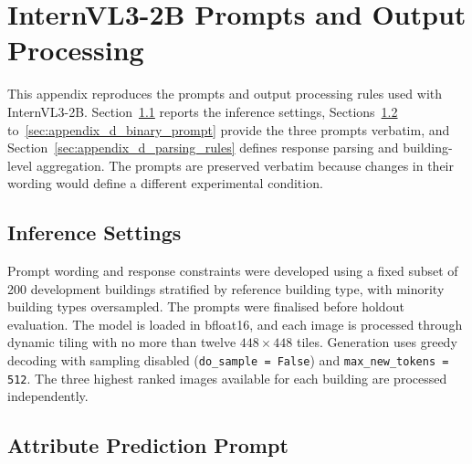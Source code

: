 \chapter{InternVL3-2B Prompts and Output Processing}
\label{ch:appendix_d}

This appendix reproduces the prompts and output processing rules used with InternVL3-2B.
Section~\ref{sec:appendix_d_inference} reports the inference settings, Sections~\ref{sec:appendix_d_attribute_prompt} to~\ref{sec:appendix_d_binary_prompt} provide the three prompts verbatim, and Section~\ref{sec:appendix_d_parsing_rules} defines response parsing and building-level aggregation.
The prompts are preserved verbatim because changes in their wording would define a different experimental condition.

\section{Inference Settings}
\label{sec:appendix_d_inference}

Prompt wording and response constraints were developed using a fixed subset of 200 development buildings stratified by reference building type, with minority building types oversampled.
The prompts were finalised before holdout evaluation.
The model is loaded in bfloat16, and each image is processed through dynamic tiling with no more than twelve \(448 \times 448\) tiles.
Generation uses greedy decoding with sampling disabled (\texttt{do\_sample = False}) and \texttt{max\_new\_tokens = 512}.
The three highest ranked images available for each building are processed independently.

\section{Attribute Prediction Prompt}
\label{sec:appendix_d_attribute_prompt}

